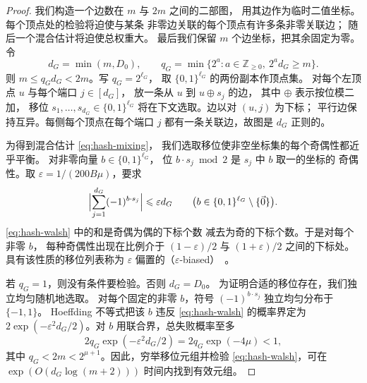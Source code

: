 \documentclass[11pt,reqno]{amsart}
\numberwithin{equation}{section}
\theoremstyle{definition}\newtheorem{definition}[theorem]{定义}
\theoremstyle{remark}\newtheorem{remark}[theorem]{注}
\renewcommand{\le}{\leqslant}
\renewcommand{\ge}{\geqslant}
\begin{document}
\begin{proof}
我们构造一个边数在 $m$ 与 $2m$ 之间的二部图，
用其边作为临时二值坐标。每个顶点处的检验将迫使与某条
非零边关联的每个顶点有许多条非零关联边；
随后一个混合估计将迫使总权重大。
最后我们保留 $m$ 个边坐标，把其余固定为零。
令
\[
 d_G=\min(m,D_0),
 \qquad
 q_G=\min\{2^a:a\in\mathbb Z_{\ge0},\ 2^a d_G\ge m\}.
\]
则 $m\le q_Gd_G<2m$。写 $q_G=2^{\ell_G}$，
取 $\{0,1\}^{\ell_G}$ 的两份副本作顶点集。
对每个左顶点 $u$ 与每个端口 $j\in[d_G]$，
放一条从 $u$ 到 $u\oplus s_j$ 的边，
其中 $\oplus$ 表示按位模二加，
移位 $s_1,\ldots,s_{d_G}\in\{0,1\}^{\ell_G}$
将在下文选取。边以对 $(u,j)$ 为下标；
平行边保持互异。每侧每个顶点在每个端口 $j$
都有一条关联边，故图是 $d_G$ 正则的。

为得到混合估计 \eqref{eq:hash-mixing}，
我们选取移位使非空坐标集的每个奇偶性都近乎平衡。
对非零向量 $b\in\{0,1\}^{\ell_G}$，
位 $b\cdot s_j\bmod2$ 是 $s_j$ 中 $b$ 取一的坐标的
奇偶性。取 $\varepsilon=1/(200B\mu)$，要求
\begin{equation}\label{eq:hash-walsh}
 \Bigl|\sum_{j=1}^{d_G}(-1)^{b\cdot s_j}\Bigr|
 \le\varepsilon d_G
 \qquad
 \bigl(b\in\{0,1\}^{\ell_G}\setminus\{\vec{0}\}\bigr).
\end{equation}
\eqref{eq:hash-walsh} 中的和是奇偶为偶的下标个数
减去为奇的下标个数。于是对每个非零 $b$，
每种奇偶性出现在比例介于 $(1-\varepsilon)/2$
与 $(1+\varepsilon)/2$ 之间的下标处。
具有该性质的移位列表称为 $\varepsilon$
偏置的（$\varepsilon$-biased）~\cite[Definitions~2.1--2.2]{NN93}。

若 $q_G=1$，则没有条件要检验。否则 $d_G=D_0$。
为证明合适的移位存在，我们独立均匀随机地选取。
对每个固定的非零 $b$，符号 $(-1)^{b\cdot s_j}$
独立均匀分布于 $\{-1,1\}$。
Hoeffding 不等式把该 $b$ 违反
\eqref{eq:hash-walsh} 的概率界定为
$2\exp(-\varepsilon^2d_G/2)$。对 $b$
用联合界，总失败概率至多
\[
 2q_G\exp(-\varepsilon^2d_G/2)
 =2q_G\exp(-4\mu)<1,
\]
其中 $q_G<2m<2^{\mu+1}$。因此，穷举移位元组并检验
\eqref{eq:hash-walsh}，可在
$\exp(O(d_G\log(m+2)))$ 时间内找到有效元组。


\end{proof}
\end{document}
